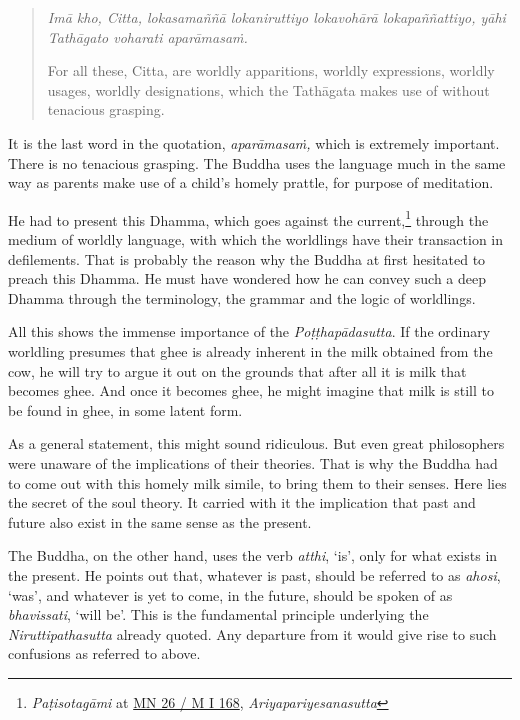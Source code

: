 \begin{quote}
\emph{Imā kho, Citta, lokasamaññā lokaniruttiyo lokavohārā lokapaññattiyo, yāhi Tathāgato voharati aparāmasaṁ.}

For all these, Citta, are worldly apparitions, worldly expressions, worldly usages, worldly designations, which the Tathāgata makes use of without tenacious grasping.
\end{quote}

It is the last word in the quotation, \emph{aparāmasaṁ,} which is extremely important. There is no tenacious grasping. The Buddha uses the language much in the same way as parents make use of a child's homely prattle, for purpose of meditation.

He had to present this Dhamma, which goes against the current,\footnote{\emph{Paṭisotagāmi} at \href{https://suttacentral.net/mn26/pli/ms}{MN 26 / M I 168}, \emph{Ariyapariyesanasutta}} through the medium of worldly language, with which the worldlings have their transaction in defilements. That is probably the reason why the Buddha at first hesitated to preach this Dhamma. He must have wondered how he can convey such a deep Dhamma through the terminology, the grammar and the logic of worldlings.

All this shows the immense importance of the \emph{Poṭṭhapādasutta}. If the ordinary worldling presumes that ghee is already inherent in the milk obtained from the cow, he will try to argue it out on the grounds that after all it is milk that becomes ghee. And once it becomes ghee, he might imagine that milk is still to be found in ghee, in some latent form.

As a general statement, this might sound ridiculous. But even great philosophers were unaware of the implications of their theories. That is why the Buddha had to come out with this homely milk simile, to bring them to their senses. Here lies the secret of the soul theory. It carried with it the implication that past and future also exist in the same sense as the present.

The Buddha, on the other hand, uses the verb \emph{atthi}, `is', only for what exists in the present. He points out that, whatever is past, should be referred to as \emph{ahosi}, `was', and whatever is yet to come, in the future, should be spoken of as \emph{bhavissati}, `will be'. This is the fundamental principle underlying the \emph{Niruttipathasutta} already quoted. Any departure from it would give rise to such confusions as referred to above.

